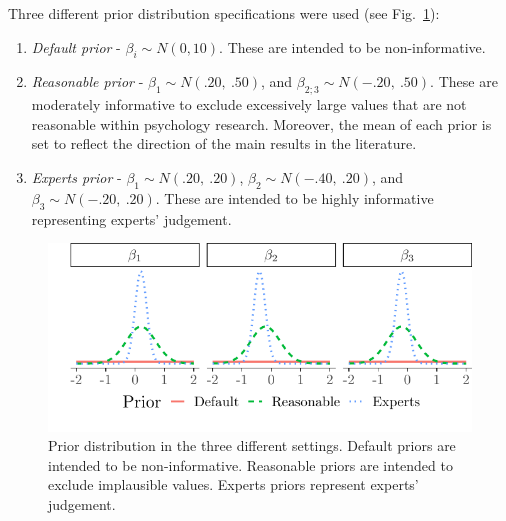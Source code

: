 \documentclass[graybox]{svmult}
\begin{document}
Three different prior distribution specifications were used (see Fig.~\ref{fig:prior}):
\begin{enumerate}
	\item{\textit{Default prior} - $\beta_i \sim N(0,10)$}. These are intended to be non-informative.
	\item{\textit{Reasonable prior} - $\beta_1\sim N(.20,\ .50)$, and  $\beta_{2;3}\sim N(-.20,\ .50)$. These are moderately informative to exclude excessively large values that are not reasonable within psychology research. Moreover, the mean of each prior is set to reflect the direction of the main results in the literature.}
 	\item{\textit{Experts prior} - $\beta_1\sim N(.20,\ .20)$,  $\beta_{2}\sim N(-.40,\ .20)$}, and $\beta_3\sim N(-.20,\ .20)$. These are intended to be highly informative representing experts' judgement. %
\end{enumerate}
\begin{figure}[b]
	\sidecaption
	\includegraphics[width = .55\textwidth]{figure/Plot_prior}
	\caption{Prior distribution in the three different settings. Default priors are intended to be non-informative. Reasonable priors  are intended to exclude implausible values. Experts priors represent experts' judgement.}
	\label{fig:prior}
\end{figure}
\end{document}
